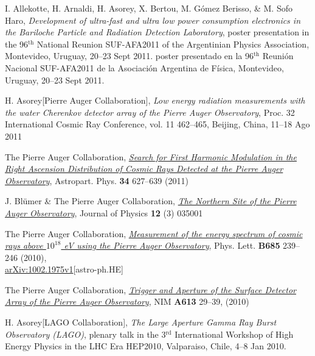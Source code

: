 \begin{etaremune}
\item {}I. Allekotte, H. Arnaldi, H. Asorey, X. Bertou, M. Gómez Berisso, \& M. Sofo Haro, {\emph{Development of ultra-fast and ultra low power consumption electronics in the Bariloche Particle and Radiation Detection Laboratory}},
\ifeng
poster presentation in the 96$^{\mathrm{th}}$ National Reunion SUF-AFA2011 of the Argentinian Physics Association, Montevideo, Uruguay, 20--23 Sept 2011.
\else
poster presentado en la 96$^{\mathrm{th}}$ Reunión Nacional SUF-AFA2011 de la Asociación Argentina de Física, Montevideo, Uruguay, 20--23 Sept 2011.
\fi

\item {}H. Asorey[Pierre Auger Collaboration], {\emph{Low energy radiation
measurements with the water Cherenkov detector array of the Pierre Auger
Observatory}}, \en Proc. 32 International Cosmic Ray Conference, vol. 11
462--465, Beijing, China, 11--18 Ago 2011

\item {}The Pierre Auger Collaboration,
\href{http://dx.doi.org/10.1016/j.astropartphys.2010.12.007}{\emph{Search for
First Harmonic Modulation in the Right Ascension Distribution of Cosmic Rays
Detected at the Pierre Auger Observatory}}, Astropart. Phys. {\bf 34} 627--639
(2011)

\item {}J. Bl\"umer \& The Pierre Auger Collaboration,
\href{http://dx.doi.org/10.1088/1367-2630/12/3/035001}{\emph{The Northern Site
of the Pierre Auger Observatory}}, Journal of Physics {\bf 12} (3) 035001

\item {}The Pierre Auger Collaboration,
\href{http://dx.doi.org/10.1016/j.physletb.2010.02.013}{\emph{Measurement of
the energy spectrum of cosmic rays above $10^{18}$ eV using the Pierre Auger
Observatory}}, Phys. Lett. {\bf B685} 239--246 (2010),\\
\href{http://arxiv.org/abs/1002.1975}{arXiv:1002.1975v1}[astro-ph.HE]

\item {}The Pierre Auger Collaboration,
\href{http://dx.doi.org/10.1016/j.nima.2009.11.018}{\emph{Trigger and Aperture
of the Surface Detector Array of the Pierre Auger Observatory}}, NIM {\bf A613}
29--39, (2010)

\item {}H. Asorey[LAGO Collaboration], {\emph{The Large Aperture Gamma Ray
Burst Observatory (LAGO)}}, plenary talk in the 3$^{\mathrm{rd}}$ International Workshop of
High Energy Physics in the LHC Era HEP2010, Valparaiso, Chile, 4--8 Jan 2010.


\end{etaremune}
